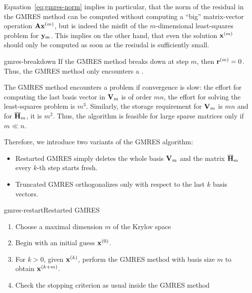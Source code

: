 \begin{remark}
  Equation~\eqref{eq:gmres-norm} implies in particular, that the norm
  of the residual in the GMRES method can be computed without
  computing a ``big'' matrix-vector operation $\mathbf A\mathbf x^{(m)}$, but is
  indeed the misfit of the $m$-dimensional least-squares problem for
  $\mathbf y_m$. This implies on the other hand, that even the solution
  $\mathbf x^{(m)}$ should only be computed as soon as the resiudal is
  sufficiently small.
\end{remark}

\begin{Lemma}{gmres-breakdown}
  If the GMRES method breaks down at step $m$, then
  $\mathbf r^{(m)}=0$. Thus, the GMRES method only encounters a
  .
\end{Lemma}

\begin{remark}
  The GMRES method encounters a problem if convergence is slow: the
  effort for computing the last basis vector in $\mathbf V_m$ is of order
  $mn$, the effort for solving the least-squares problem is
  $m^3$. Similarly, the storage requirement for $\mathbf V_m$ is $mn$ and
  for $\overline {\mathbf H}_m$, it is $m^2$. Thus, the algorithm is
  feasible for large sparse matrices only if $m\ll n$.

  Therefore, we introduce two variants of the GMRES algorithm:
  \begin{itemize}
  \item Restarted GMRES simply deletes the whole basis $\mathbf V_m$ and the matrix $\overline{\mathbf H}_m$ every $k$-th step starts fresh.
  \item Truncated GMRES orthogonalizes only with respect to the last
    $k$ basis vectors.
  \end{itemize}
\end{remark}

\begin{Algorithm*}{gmres-restart}{Restarted GMRES}
  \begin{enumerate}
  \item Choose a maximal dimension $m$ of the Krylov space
  \item Begin with an initial guess $\mathbf x^{(0)}$.
  \item For $k>0$, given $\mathbf x^{(k)}$, perform the GMRES method with
    basis size $m$ to obtain $\mathbf x^{(k+m)}$.
  \item Check the stopping criterion as usual inside the GMRES method
  \end{enumerate}
\end{Algorithm*}

